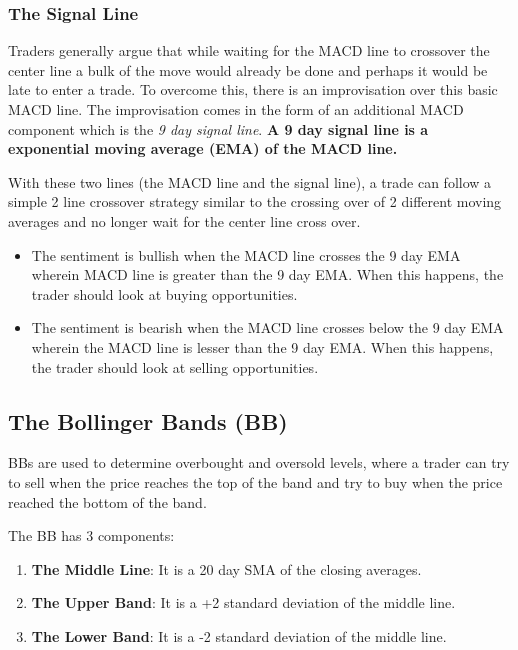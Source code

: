 \subsubsection{The Signal Line}
Traders generally argue that while waiting for the MACD line to crossover the center line a bulk of the move would already be done and perhaps it would be late to enter a trade. To overcome this, there is an improvisation over this basic MACD line. The improvisation comes in the form of an additional MACD component which is the \emph{9 day signal line}. \textbf{A 9 day signal line is a exponential moving average (EMA) of the MACD line.}

With these two lines (the MACD line and the signal line), a trade can follow a simple 2 line crossover strategy similar to the crossing over of 2 different moving averages and no longer wait for the center line cross over.

\begin{itemize}
  \item The sentiment is bullish when the MACD line crosses the 9 day EMA wherein MACD line is greater than the 9 day EMA. When this happens, the trader should look at buying opportunities.
  \item The sentiment is bearish when the MACD line crosses below the 9 day EMA wherein the MACD line is lesser than the 9 day EMA. When this happens, the trader should look at selling opportunities.
\end{itemize}

\subsection{The Bollinger Bands (BB)}

BBs are used to determine overbought and oversold levels, where a trader can try to sell when the price reaches the top of the band and try to buy when the price reached the bottom of the band.

The BB has 3 components:
\begin{enumerate}
  \item \textbf{The Middle Line}: It is a 20 day SMA of the closing averages.
  \item \textbf{The Upper Band}: It is a +2 standard deviation of the middle line.
  \item \textbf{The Lower Band}: It is a -2 standard deviation of the middle line.
\end{enumerate}

